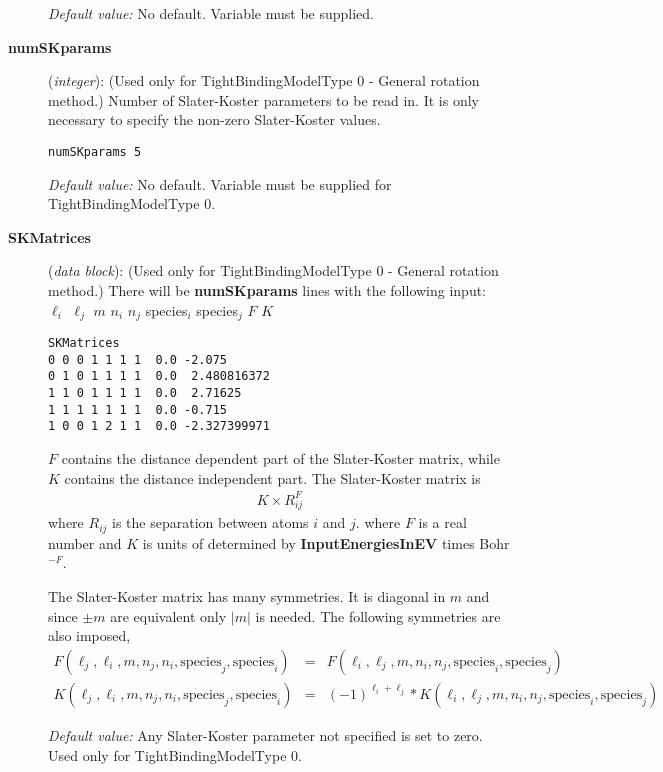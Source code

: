 \begin{description}
{\it Default value:} No default.  Variable must be supplied.

\item[{\bf numSKparams}] ({\it integer}):  (Used only for TightBindingModelType 0 - General
rotation method.) Number of Slater-Koster parameters to be read
in. It is only necessary to specify the non-zero Slater-Koster
values.
\begin{verbatim}
numSKparams 5
\end{verbatim}

{\it Default value:} No default.  Variable must be supplied for
TightBindingModelType 0.

\item[{\bf SKMatrices}] ({\it data block}):  (Used only for TightBindingModelType 0 - General
rotation method.)
There will be {\bf numSKparams} lines with the following input:\\
$\ell_i$ $\ell_j$ $m$ $n_i$ $n_j$ species$_i$ species$_j$  $F$ $K$

\begin{verbatim}
SKMatrices
0 0 0 1 1 1 1  0.0 -2.075
0 1 0 1 1 1 1  0.0  2.480816372
1 1 0 1 1 1 1  0.0  2.71625
1 1 1 1 1 1 1  0.0 -0.715
1 0 0 1 2 1 1  0.0 -2.327399971
\end{verbatim}

$F$ contains the distance dependent part of the Slater-Koster matrix,
while $K$ contains the distance independent part. The Slater-Koster
matrix is
\begin{eqnarray*}
K \times R_{ij}^F
\end{eqnarray*}
where $R_{ij}$ is the separation between atoms $i$ and $j$.  where
$F$ is a real number and $K$ is units of determined by {\bf
InputEnergiesInEV} times Bohr$^{-F}$.

The Slater-Koster matrix has many symmetries. It is diagonal in $m$ and
since $\pm m$ are equivalent only $|m|$ is needed. The following
symmetries are also imposed,
\begin{eqnarray*}
F(\ell_j,\ell_i,m,n_j,n_i,\mathrm{species}_j,\mathrm{species}_i) & = &
F(\ell_i,\ell_j,m,n_i,n_j,\mathrm{species}_i,\mathrm{species}_j) \\
K(\ell_j,\ell_i,m,n_j,n_i,\mathrm{species}_j,\mathrm{species}_i) & = &
(-1)^{\ell_i + \ell_j}*K(\ell_i,\ell_j,m,n_i,n_j,\mathrm{species}_i,\mathrm{species}_j)
\end{eqnarray*}

{\it Default value:} Any Slater-Koster parameter not specified is
set to zero. Used only for TightBindingModelType 0.

\end{description}

